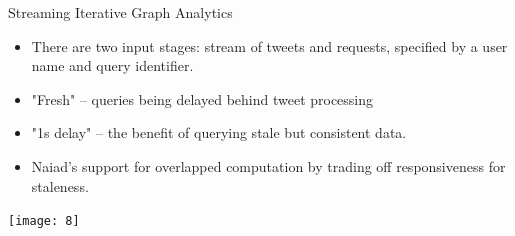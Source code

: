 \begin{frame}[t]{Streaming Iterative Graph Analytics}
  \vspace{0.15cm}

  \begin{itemize}
    \setlength\itemsep{0.15cm}
    \item There are two input stages: stream of tweets and requests, specified by a user name and query identifier.
    \item "Fresh" -- queries being delayed behind tweet processing
    \item "1s delay" -- the benefit of querying stale but consistent data.
    \item Naiad’s support for overlapped computation by trading off responsiveness for staleness.
  \end{itemize}

  \vspace{0.15cm}
  \begin{center}
    \texttt{[image: 8]}
  \end{center}
\end{frame}